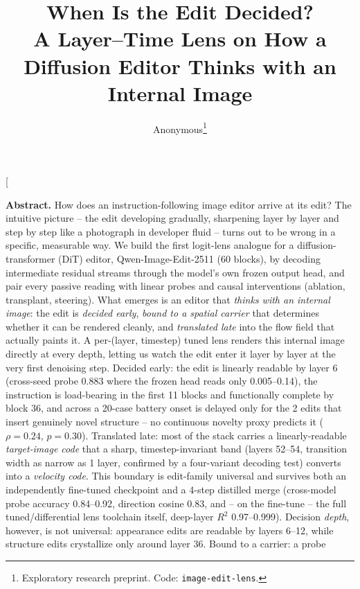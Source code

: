 \documentclass[10pt,twocolumn]{article}
\title{\LARGE\bf When Is the Edit Decided?\\[2pt]
\Large A Layer--Time Lens on How a Diffusion Editor Thinks with an Internal Image}
\author{%
Anonymous\thanks{Exploratory research preprint. Code: \texttt{image-edit-lens}.}\\
}
\date{}
\newcommand{\model}{Qwen-Image-Edit-2511}
\begin{document}
\raggedbottom
\twocolumn[
  \maketitle
  \vspace{-2.2em}
  \begin{center}\begin{minipage}{0.92\textwidth}
  \small
  \textbf{Abstract.}
  How does an instruction-following image editor arrive at its edit?
  The intuitive picture -- the edit developing gradually, sharpening
  layer by layer and step by step like a photograph in developer fluid
  -- turns out to be wrong in a specific, measurable way. We build the
  first logit-lens analogue for a diffusion-transformer (DiT) editor,
  \model{} (60 blocks), by decoding intermediate residual streams
  through the model's own frozen output head, and pair every passive
  reading with linear probes and causal interventions (ablation,
  transplant, steering). What emerges is an editor that \emph{thinks
  with an internal image}: the edit is \emph{decided early},
  \emph{bound to a spatial carrier} that determines whether it can be
  rendered cleanly, and \emph{translated late} into the flow field that
  actually paints it. A per-(layer, timestep) tuned lens renders this
  internal image directly at every depth, letting us watch the edit
  enter it layer by layer at the very first denoising step. Decided
  early: the edit is linearly readable by
  layer 6 (cross-seed probe 0.883 where the frozen head reads only
  0.005--0.14), the instruction is load-bearing in the first 11 blocks
  and functionally complete by block 36, and across a 20-case battery
  onset is delayed only for the 2 edits that insert genuinely novel
  structure -- no continuous novelty proxy predicts it ($\rho=0.24$,
  $p=0.30$). Translated late: most of the stack carries a
  linearly-readable \emph{target-image code} that a sharp,
  timestep-invariant band (layers 52--54, transition width as narrow
  as 1 layer, confirmed by a four-variant decoding test) converts into
  a \emph{velocity code}. This boundary is edit-family universal and
  survives both an independently fine-tuned checkpoint and a 4-step
  distilled merge (cross-model probe accuracy 0.84--0.92, direction
  cosine 0.83, and -- on the fine-tune -- the full tuned/differential
  lens toolchain itself, deep-layer $R^2$ 0.97--0.999). Decision
  \emph{depth}, however, is not universal: appearance edits are
  readable by layers 6--12, while structure edits crystallize only
  around layer 36. Bound to a carrier: a probe

\end{minipage}
\end{center}
\end{document}
